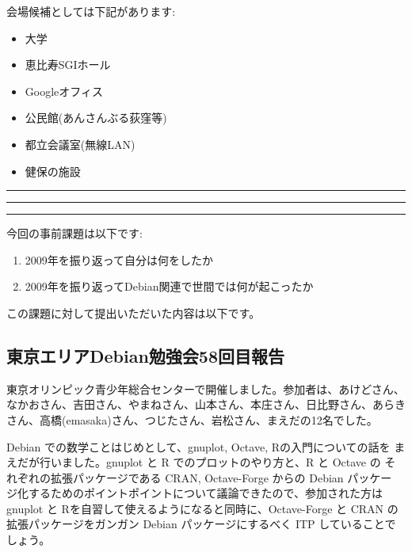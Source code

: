 \documentclass[mingoth,a4paper]{jsarticle}
\begin{document}
\begin{multicols}{2}
 会場候補としては下記があります:

 \begin{itemize}
  \item 大学
  \item 恵比寿SGIホール
  \item Googleオフィス
  \item 公民館(あんさんぶる荻窪等)
  \item 都立会議室(無線LAN)
  \item 健保の施設
 \end{itemize}

\end{multicols}

\newpage

\begin{minipage}[b]{0.2\hsize}
 \colorbox{titleback}{}
\end{minipage}
\begin{minipage}[b]{0.8\hsize}
\hrule
\vspace{2mm}
\hrule
\tableofcontents
\vspace{2mm}
\hrule
\end{minipage}


今回の事前課題は以下です:

\begin{enumerate}
 \item 2009年を振り返って自分は何をしたか
 \item 2009年を振り返ってDebian関連で世間では何が起こったか
\end{enumerate}

この課題に対して提出いただいた内容は以下です。



\subsection{東京エリアDebian勉強会58回目報告}

東京オリンピック青少年総合センターで開催しました。参加者は、あけどさん、
なかおさん、吉田さん、やまねさん、山本さん、本庄さん、日比野さん、あらき
さん、高橋(emasaka)さん、つじたさん、岩松さん、まえだの12名でした。

Debian での数学ことはじめとして、gnuplot, Octave, Rの入門についての話を
まえだが行いました。gnuplot と R でのプロットのやり方と、R と Octave の
それぞれの拡張パッケージである CRAN, Octave-Forge からの Debian パッケー
ジ化するためのポイントポイントについて議論できたので、参加された方は
gnuplot と Rを自習して使えるようになると同時に、Octave-Forge と CRAN の
拡張パッケージをガンガン Debian パッケージにするべく ITP していることで
しょう。
\end{document}

